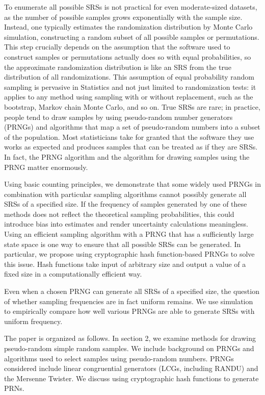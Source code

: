 \documentclass[12pt]{article}
\newcommand{\todo}[1]{{\color{red}{TO DO: \sc #1}}}
\begin{document}
\todo{intro to what might be done with SRSs: randomization to estimate distributions etc}
To enumerate all possible SRSs is not practical for even moderate-sized datasets, as the number of possible samples grows exponentially with the sample size.
Instead, one typically estimates the randomization distribution by Monte Carlo simulation, constructing a random subset of all possible samples or permutations.
This step crucially depends on the assumption that the software used to construct samples or permutations actually does so with equal probabilities, 
so the approximate randomization distribution is like an SRS from the true distribution of all randomizations.
This assumption of equal probability random sampling is pervasive in Statistics and not just limited to randomization tests:
it applies to any method using sampling with or without replacement, such as the bootstrap, Markov chain Monte Carlo, and so on.
True SRSs are rare; in practice, people tend to draw samples by using pseudo-random number generators 
(PRNGs) and algorithms that map a set of pseudo-random numbers into a subset of the population. 
Most statisticians take for granted that the software they use works as expected and
produces samples that can be treated as if they are SRSs.
In fact, the PRNG algorithm and the algorithm for drawing samples using the PRNG matter enormously.

Using basic counting principles, we demonstrate that some widely used PRNGs in combination with particular sampling algorithms cannot possibly generate all SRSs of a specified size.
If the frequency of samples generated by one of these methods does not reflect the theoretical sampling probabilities, this could introduce bias into estimates and render uncertainty calculations meaningless.
Using an efficient sampling algorithm with a PRNG that has a sufficiently large state space is one way to ensure that all possible SRSs can be generated.
In particular, we propose using cryptographic hash function-based PRNGs to solve this issue.
Hash functions take input of arbitrary size and output a value of a fixed size in a computationally efficient way.
\todo{flesh out}

Even when a chosen PRNG can generate all SRSs of a specified size, the question of whether sampling frequencies are in fact uniform remains.
We use simulation to empirically compare how well various PRNGs are able to generate SRSs with uniform frequency.
\todo{briefly state results}

The paper is organized as follows. In section 2, we examine methods for drawing pseudo-random simple random samples. 
We include background on PRNGs and algorithms used to select samples using pseudo-random numbers.
PRNGs considered include linear congruential generators (LCGs, including RANDU)
and the Mersenne Twister. We discuss using cryptographic hash functions to generate PRNs.
\todo{...}
\end{document}
